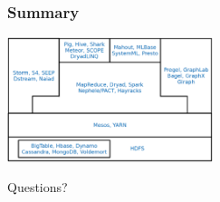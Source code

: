 \documentclass{beamer}
\begin{document}
\begin{frame}
\frametitle{Summary}
\hspace*{3cm}\includegraphics[width=6cm]{figs/summary.pdf}
\end{frame}

\begin{frame}
\vspace{1cm}
\Huge{\centerline{Questions?}}
\end{frame}
\end{document}
